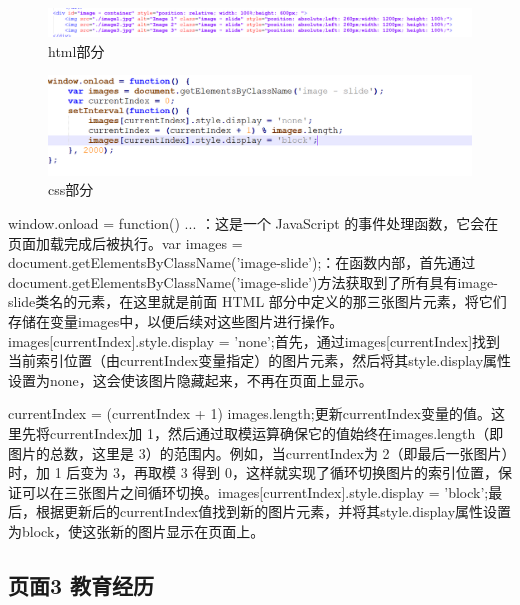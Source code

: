 \documentclass[supercite]{Experimental_Report}
\theoremstyle{definition}
\begin{document}
\begin{figure}[htb]
	\begin{center}
		\includegraphics[scale=0.30]{images/4-1.png}
		\caption{html部分}
		\label{fig4-1}
	\end{center}
\end{figure}



\begin{figure}[htb]
	\begin{center}
		\includegraphics[scale=0.40]{images/4-2.png}
		\caption{css部分}
		\label{fig4-2}
	\end{center}
\end{figure}

window.onload = function() {... }：这是一个 JavaScript 的事件处理函数，它会在页面加载完成后被执行。var images = document.getElementsByClassName('image-slide');：在函数内部，首先通过document.getElementsByClassName('image-slide')方法获取到了所有具有image-slide类名的元素，在这里就是前面 HTML 部分中定义的那三张图片元素，将它们存储在变量images中，以便后续对这些图片进行操作。images[currentIndex].style.display = 'none';首先，通过images[currentIndex]找到当前索引位置（由currentIndex变量指定）的图片元素，然后将其style.display属性设置为none，这会使该图片隐藏起来，不再在页面上显示。

currentIndex = (currentIndex + 1)  images.length;更新currentIndex变量的值。这里先将currentIndex加 1，然后通过取模运算确保它的值始终在images.length（即图片的总数，这里是 3）的范围内。例如，当currentIndex为 2（即最后一张图片）时，加 1 后变为 3，再取模 3 得到 0，这样就实现了循环切换图片的索引位置，保证可以在三张图片之间循环切换。images[currentIndex].style.display = 'block';最后，根据更新后的currentIndex值找到新的图片元素，并将其style.display属性设置为block，使这张新的图片显示在页面上。





\subsection{页面3 教育经历}
\end{document}
